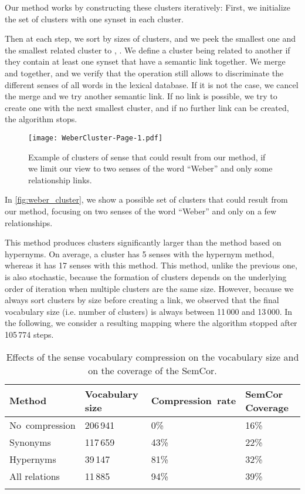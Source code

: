 \documentclass[11pt]{article}
\begin{document}
Our method works by constructing these clusters iteratively: First, we initialize the set of clusters  with one synset in each cluster.

Then at each step, we sort  by sizes of clusters, and we peek the smallest one  and the smallest related cluster to , . We define a cluster being related to another if they contain at least one synset that have a semantic link together.
We merge  and  together, and we verify that the operation still allows to discriminate the different senses of all words in the lexical database. If it is not the case, we cancel the merge and we try another semantic link. If no link is possible, we try to create one with the next smallest cluster, and if no further link can be created, the algorithm stops.




\begin{figure}[htbp]
\centering
\texttt{[image: WeberCluster-Page-1.pdf]}
\caption{Example of clusters of sense that could result from our method, if we limit our view to two senses of the word ``Weber'' and only some relationship links.}
\label{fig:weber_cluster}
\end{figure}

In \autoref{fig:weber_cluster}, we show a possible set of clusters that could result from our method, focusing on two senses of the word ``Weber'' and only on a few relationships. 




This method produces clusters significantly larger than the method based on hypernyms. On average, a cluster has 5 senses with the hypernym method, whereas it has 17 senses with this method. This method, unlike the previous one, is also stochastic, because the formation of clusters depends on the underlying order of iteration when multiple clusters are the same size. However, because we always sort clusters by size before creating a link, we observed that the final vocabulary size (i.e. number of clusters) is always between 11\,000 and 13\,000.
In the following, we consider a resulting mapping where the algorithm stopped after 105\,774 steps.

\begin{table}[htbp]
\small
\begin{center}
\tabulinesep=3pt
\begin{tabu} to \linewidth {|X[2.9lm]|X[1.9cm]|X[1.8cm]|X[1.8cm]|} \firsthline
Method & Vocabulary size & Compres\-sion~rate & SemCor Coverage  \\
\hline
No~compression & 206\,941 & 0\% & 16\% \\
Synonyms & 117\,659 & 43\% & 22\% \\
Hypernyms & 39\,147 & 81\% & 32\% \\
All relations & 11\,885 & 94\% & 39\% \\
\lasthline
\end{tabu}
\end{center}
\caption{Effects of the sense vocabulary compression on the vocabulary size and on the coverage of the SemCor.}
\label{tab:vocabulary_compression}
\end{table}
\end{document}
